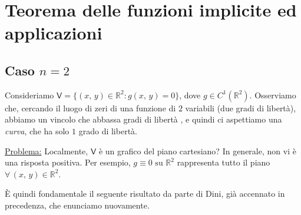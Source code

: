 \graphicspath{{03_teorema_delle_funzioni_implicite/figures/PNG/}{03_teorema_delle_funzioni_implicite/figures/PDF/}{03_teorema_delle_funzioni_implicite/figures/}}


\chapter{Teorema delle funzioni implicite ed applicazioni}
\copyrightnotice
\section{Caso $n=2$}
Consideriamo $\mathsf{V} = \lbrace (x,\,y) \in \mathbb{R}^2 : g(x,\,y) = 0 \rbrace$, dove $g \in C^1(\mathbb{R}^2)$. Osserviamo che, cercando il luogo di zeri di una funzione di $2$ variabili (due gradi di libertà), abbiamo un vincolo che abbassa gradi di libertà , e quindi ci aspettiamo una \emph{curva}, che ha solo $1$ grado di libertà.
\begin{center}
\def\svgwidth{6cm}

\end{center}

\noindent \underline{Problema:} Localmente, $\mathsf{V}$ è un grafico del piano cartesiano? In generale, non vi è una risposta positiva. Per esempio, $g \equiv 0 \text{ su } \mathbb{R}^2$ rappresenta tutto il piano $\forall \, (x,\,y) \in \mathbb{R}^2$.

\`E quindi fondamentale il seguente risultato da parte di Dini, già accennato in precedenza, che enunciamo nuovamente.

